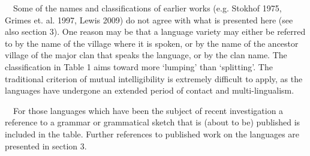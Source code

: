 \ \ Some of the names and classifications of earlier works (e.g. Stokhof 1975, Grimes et. al. 1997, Lewis 2009) do not agree with what is presented here (see also section 3). One reason may be that a language variety may either be referred to by the name of the village where it is spoken, or by the name of the ancestor village of the major clan that speaks the language, or by the clan name. The classification in Table 1 aims toward more {\textquoteleft}lumping{\textquoteright} than {\textquoteleft}splitting{\textquoteright}. The traditional criterion of mutual intelligibility is extremely difficult to apply, as the languages have undergone an extended period of contact and multi-lingualism. 

\ \ For those languages which have been the subject of recent investigation a reference to a grammar or grammatical sketch that is (about to be) published is included in the table. Further references to published work on the languages are presented in section 3.


